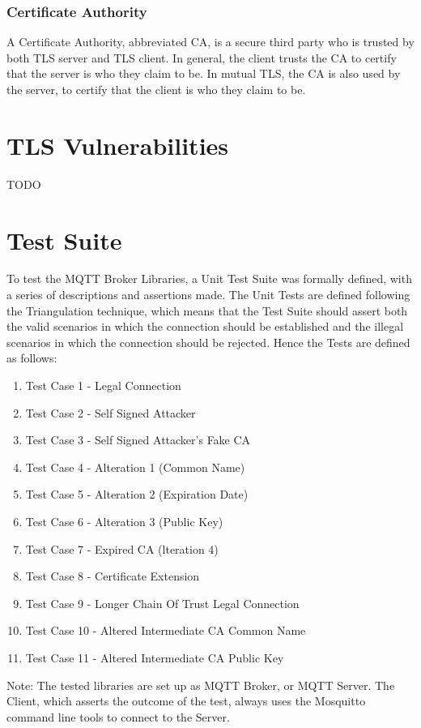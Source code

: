 \documentclass[binding=0.6cm,noexaminfo]{sapthesis}
\begin{document}
\subsection{Certificate Authority}
A Certificate Authority, abbreviated CA, is a secure third party who is trusted by both TLS server and TLS client. In general, the client trusts the CA to certify that the server is who they claim to be. In mutual TLS, the CA is also used by the server, to certify that the client is who they claim to be.

\chapter{TLS Vulnerabilities} TODO
\chapter{Test Suite}
To test the MQTT Broker Libraries, a Unit Test Suite was formally defined, with a series of descriptions and assertions made. The Unit Tests are defined following the Triangulation technique, which means that the Test Suite should assert both the valid scenarios in which the connection should be established and the illegal scenarios in which the connection should be rejected. Hence the Tests are defined as follows:
\begin{enumerate}
	\item Test Case 1 - Legal Connection
	\item Test Case 2 - Self Signed Attacker
	\item Test Case 3 - Self Signed Attacker's Fake CA
	\item Test Case 4 - Alteration 1 (Common Name)
	\item Test Case 5 - Alteration 2 (Expiration Date)
	\item Test Case 6 - Alteration 3 (Public Key)
	\item Test Case 7 - Expired CA (lteration 4)
	\item Test Case 8 - Certificate Extension
	\item Test Case 9 - Longer Chain Of Trust Legal Connection
	\item Test Case 10 - Altered Intermediate CA Common Name
	\item Test Case 11 - Altered Intermediate CA Public Key
\end{enumerate}
Note: The tested libraries are set up as MQTT Broker, or MQTT Server. The Client, which asserts the outcome of the test, always uses the Mosquitto command line tools to connect to the Server.
\end{document}
